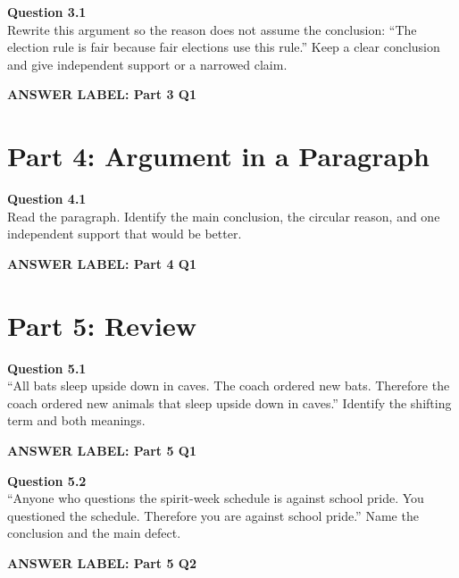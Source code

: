 \documentclass[12pt]{article}
\newcommand{\answerbox}[2]{%
\vspace{0.15em}
\noindent\textbf{#1}\par
\vspace{0.05em}
\noindent\fbox{%
\begin{minipage}[t][#2]{\dimexpr\textwidth-2\fboxsep-2\fboxrule}
\rule{\textwidth}{0pt}
\vspace{#2}
\end{minipage}
}\par
\vspace{0.25em}
}
\begin{document}
\textbf{Question 3.1}\\[-0.15em]
Rewrite this argument so the reason does not assume the conclusion: ``The election rule is fair because fair elections use this rule.'' Keep a clear conclusion and give independent support or a narrowed claim.

\answerbox{ANSWER LABEL: Part 3 Q1}{2.85in}

\newpage

\section*{Part 4: Argument in a Paragraph}

\textbf{Question 4.1}\\[-0.15em]
Read the paragraph. Identify the main conclusion, the circular reason, and one independent support that would be better.

\vspace{0.2em}

\noindent{}

\answerbox{ANSWER LABEL: Part 4 Q1}{2.55in}

\newpage

\section*{Part 5: Review}

\textbf{Question 5.1}\\[-0.15em]
``All bats sleep upside down in caves. The coach ordered new bats. Therefore the coach ordered new animals that sleep upside down in caves.'' Identify the shifting term and both meanings.

\answerbox{ANSWER LABEL: Part 5 Q1}{2.15in}

\textbf{Question 5.2}\\[-0.15em]
``Anyone who questions the spirit-week schedule is against school pride. You questioned the schedule. Therefore you are against school pride.'' Name the conclusion and the main defect.

\answerbox{ANSWER LABEL: Part 5 Q2}{1.85in}
\end{document}
